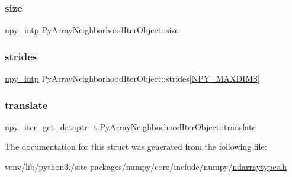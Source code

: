 \mbox{\label{structPyArrayNeighborhoodIterObject_afba9ba4e022e923157055053346320ff}} 
\subsubsection{\texorpdfstring{size}{size}}
{\footnotesize\ttfamily \hyperlink{npy__common_8h_a2d6effc4d5ecb85675ebfcfaa102b483}{npy\+\_\+intp} Py\+Array\+Neighborhood\+Iter\+Object\+::size}

\mbox{\label{structPyArrayNeighborhoodIterObject_ae111f2ba7ac9eeff57eb25b728b5f936}} 
\subsubsection{\texorpdfstring{strides}{strides}}
{\footnotesize\ttfamily \hyperlink{npy__common_8h_a2d6effc4d5ecb85675ebfcfaa102b483}{npy\+\_\+intp} Py\+Array\+Neighborhood\+Iter\+Object\+::strides\mbox{[}\hyperlink{ndarraytypes_8h_a737679ea9ee902bfa707c146051c17b5}{N\+P\+Y\+\_\+\+M\+A\+X\+D\+I\+MS}\mbox{]}}

\mbox{\label{structPyArrayNeighborhoodIterObject_a5a8b049ee7e72ab78a87569652495af9}} 
\subsubsection{\texorpdfstring{translate}{translate}}
{\footnotesize\ttfamily \hyperlink{ndarraytypes_8h_ac00f3035372c5ae1bc9e6187aa135818}{npy\+\_\+iter\+\_\+get\+\_\+dataptr\+\_\+t} Py\+Array\+Neighborhood\+Iter\+Object\+::translate}



The documentation for this struct was generated from the following file\+:\begin{DoxyCompactItemize}
\item 
venv/lib/python3./site-\/packages/numpy/core/include/numpy/\hyperlink{ndarraytypes_8h}{ndarraytypes.\+h}\end{DoxyCompactItemize}
